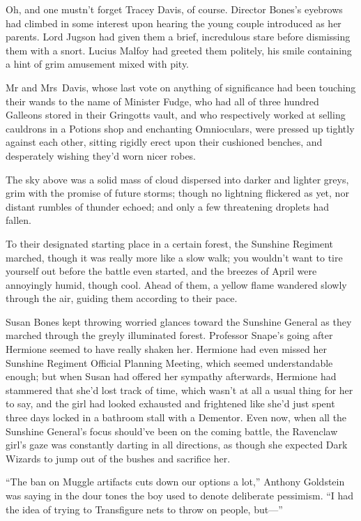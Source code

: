 Oh, and one mustn’t forget Tracey Davis, of course. Director Bones’s eyebrows had climbed in some interest upon hearing the young couple introduced as her parents. Lord Jugson had given them a brief, incredulous stare before dismissing them with a snort. Lucius Malfoy had greeted them politely, his smile containing a hint of grim amusement mixed with pity.

Mr and Mrs~Davis, whose last vote on anything of significance had been touching their wands to the name of Minister Fudge, who had all of three hundred Galleons stored in their Gringotts vault, and who respectively worked at selling cauldrons in a Potions shop and enchanting Omnioculars, were pressed up tightly against each other, sitting rigidly erect upon their cushioned benches, and desperately wishing they’d worn nicer robes.

The sky above was a solid mass of cloud dispersed into darker and lighter greys, grim with the promise of future storms; though no lightning flickered as yet, nor distant rumbles of thunder echoed; and only a few threatening droplets had fallen.

\later

To their designated starting place in a certain forest, the Sunshine Regiment marched, though it was really more like a slow walk; you wouldn’t want to tire yourself out before the battle even started, and the breezes of April were annoyingly humid, though cool. Ahead of them, a yellow flame wandered slowly through the air, guiding them according to their pace.

Susan Bones kept throwing worried glances toward the Sunshine General as they marched through the greyly illuminated forest. Professor Snape’s going after Hermione seemed to have really shaken her. Hermione had even missed her Sunshine Regiment Official Planning Meeting, which seemed understandable enough; but when Susan had offered her sympathy afterwards, Hermione had stammered that she’d lost track of time, which wasn’t at all a usual thing for her to say, and the girl had looked exhausted and frightened like she’d just spent three days locked in a bathroom stall with a Dementor. Even now, when all the Sunshine General’s focus should’ve been on the coming battle, the Ravenclaw girl’s gaze was constantly darting in all directions, as though she expected Dark Wizards to jump out of the bushes and sacrifice her.

“The ban on Muggle artifacts cuts down our options a lot,” Anthony Goldstein was saying in the dour tones the boy used to denote deliberate pessimism. “I had the idea of trying to Transfigure nets to throw on people, but—”

